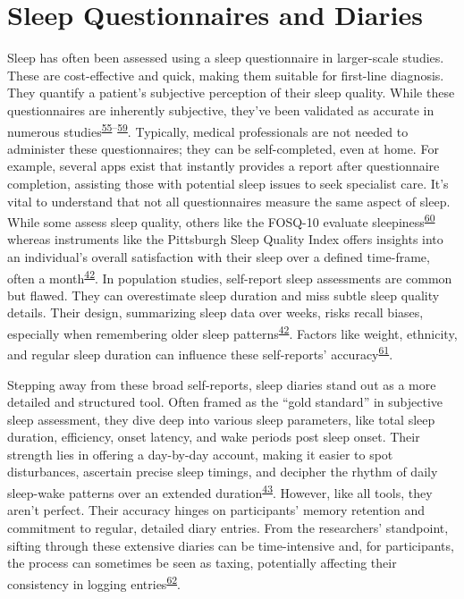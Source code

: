 \documentclass[
  10pt,
]{scrbook}
\begin{document}
\hypertarget{sleep-questionnaires-and-diaries}{%
\section{Sleep Questionnaires and
Diaries}\label{sleep-questionnaires-and-diaries}}

Sleep has often been assessed using a sleep questionnaire in
larger-scale studies. These are cost-effective and quick, making them
suitable for first-line diagnosis. They quantify a patient's subjective
perception of their sleep quality. While these questionnaires are
inherently subjective, they've been validated as accurate in numerous
studies\textsuperscript{\protect\hyperlink{ref-silva_2011}{55}--\protect\hyperlink{ref-pataka_2014}{59}}.
Typically, medical professionals are not needed to administer these
questionnaires; they can be self-completed, even at home. For example,
several apps exist that instantly provides a report after questionnaire
completion, assisting those with potential sleep issues to seek
specialist care. It's vital to understand that not all questionnaires
measure the same aspect of sleep. While some assess sleep quality,
others like the FOSQ-10 evaluate
sleepiness\textsuperscript{\protect\hyperlink{ref-chasens_2009}{60}}
whereas instruments like the Pittsburgh Sleep Quality Index offers
insights into an individual's overall satisfaction with their sleep over
a defined time-frame, often a
month\textsuperscript{\protect\hyperlink{ref-sadeh_2015}{42}}. In
population studies, self-report sleep assessments are common but flawed.
They can overestimate sleep duration and miss subtle sleep quality
details. Their design, summarizing sleep data over weeks, risks recall
biases, especially when remembering older sleep
patterns\textsuperscript{\protect\hyperlink{ref-sadeh_2015}{42}}.
Factors like weight, ethnicity, and regular sleep duration can influence
these self-reports'
accuracy\textsuperscript{\protect\hyperlink{ref-lauderdale_2008}{61}}.

Stepping away from these broad self-reports, sleep diaries stand out as
a more detailed and structured tool. Often framed as the ``gold
standard'' in subjective sleep assessment, they dive deep into various
sleep parameters, like total sleep duration, efficiency, onset latency,
and wake periods post sleep onset. Their strength lies in offering a
day-by-day account, making it easier to spot disturbances, ascertain
precise sleep timings, and decipher the rhythm of daily sleep-wake
patterns over an extended
duration\textsuperscript{\protect\hyperlink{ref-ibuxe1uxf1ez_2018}{43}}.
However, like all tools, they aren't perfect. Their accuracy hinges on
participants' memory retention and commitment to regular, detailed diary
entries. From the researchers' standpoint, sifting through these
extensive diaries can be time-intensive and, for participants, the
process can sometimes be seen as taxing, potentially affecting their
consistency in logging
entries\textsuperscript{\protect\hyperlink{ref-thurman_2018}{62}}.
\end{document}
